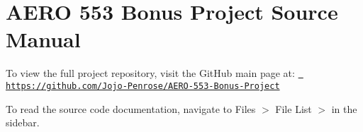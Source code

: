 \chapter{AERO 553 Bonus Project Source Manual}
\hypertarget{index}{}\label{index}
To view the full project repository, visit the Git\+Hub main page at\+: \href{https://github.com/Jojo-Penrose/AERO-553-Bonus-Project}{\texttt{ https\+://github.\+com/\+Jojo-\/\+Penrose/\+AERO-\/553-\/\+Bonus-\/\+Project}}

To read the source code documentation, navigate to Files \texorpdfstring{$>$}{>} File List \texorpdfstring{$>$}{>}  in the sidebar. 
